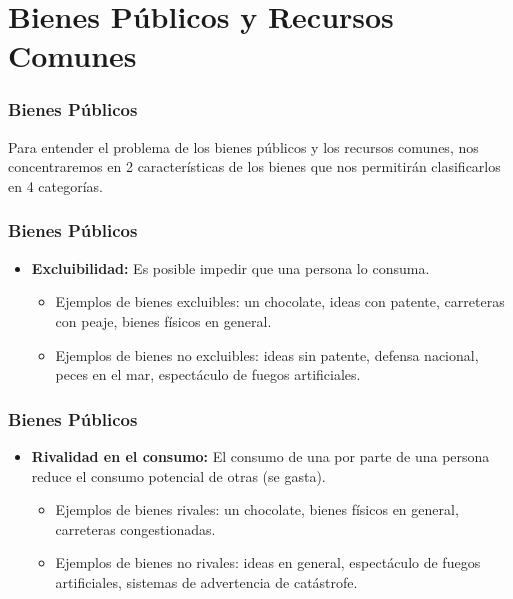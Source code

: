 \documentclass[dvipsnames,table,leqno]{beamer}
\begin{document}
	\section{Bienes Públicos y Recursos Comunes}

		\begin{frame}
			\frametitle{Bienes Públicos}
			Para entender el problema de los bienes públicos y los recursos comunes, nos concentraremos en 2 características de los bienes que nos permitirán clasificarlos en 4 categorías.
		\end{frame}

		\begin{frame}
			\frametitle{Bienes Públicos}
			\begin{itemize}
				\item \textbf{Excluibilidad:} Es posible impedir que una persona lo consuma.
					\begin{itemize}
						\item Ejemplos de bienes excluibles: un chocolate, ideas con patente, carreteras con peaje, bienes físicos en general.
						\item Ejemplos de bienes no excluibles: ideas sin patente, defensa nacional, peces en el mar, espectáculo de fuegos artificiales.
					\end{itemize}
			\end{itemize}
		\end{frame}

		\begin{frame}
			\frametitle{Bienes Públicos}
			\begin{itemize}
				\item \textbf{Rivalidad en el consumo:} El consumo de una por parte de una persona reduce el consumo potencial de otras (se gasta).
					\begin{itemize}
						\item Ejemplos de bienes rivales: un chocolate, bienes físicos en general, carreteras congestionadas.
						\item Ejemplos de bienes no rivales: ideas en general, espectáculo de fuegos artificiales, sistemas de advertencia de catástrofe.
					\end{itemize}
			\end{itemize}
		\end{frame}
\end{document}
